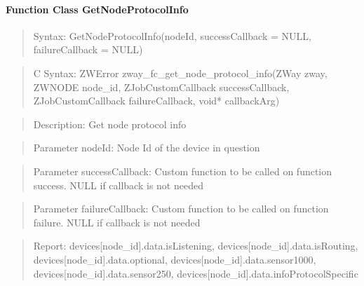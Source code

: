 \paragraph{Function Class GetNodeProtocolInfo}
\begin{quote}Syntax: GetNodeProtocolInfo(nodeId, successCallback = NULL, failureCallback = NULL)\end{quote}
\begin{quote}C Syntax: ZWError zway\_fc\_get\_node\_protocol\_info(ZWay zway, ZWNODE node\_id, ZJobCustomCallback successCallback, ZJobCustomCallback failureCallback, void* callbackArg)\end{quote}
\begin{quote}Description: Get node protocol info\end{quote}
\begin{quote}Parameter nodeId: Node Id of the device in question\end{quote}
\begin{quote}Parameter successCallback: Custom function to be called on function success. NULL if callback is not needed\end{quote}
\begin{quote}Parameter failureCallback: Custom function to be called on function failure. NULL if callback is not needed\end{quote}
\begin{quote}Report: devices[node\_id].data.isListening, devices[node\_id].data.isRouting, devices[node\_id].data.optional, devices[node\_id].data.sensor1000, devices[node\_id].data.sensor250, devices[node\_id].data.infoProtocolSpecific\end{quote}

